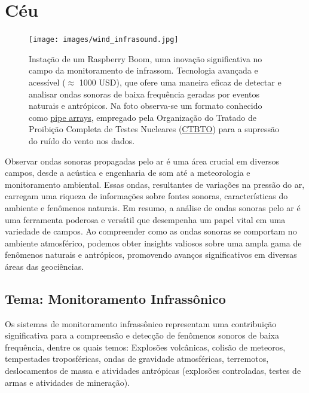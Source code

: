 \documentclass[10pt,a4paper,oneside]{book}
\newcommand{\HeroFigPad}{\vspace{-1cm}}
\begin{document}
\chapter{Céu}
\label{cap_ceu}

\begin{figure}[h]
	\HeroFigPad
	\begin{center}
		\texttt{[image: images/wind\_infrasound.jpg]}
	\end{center}
	\caption{
	Instação de um Raspberry Boom, uma inovação significativa no campo da monitoramento de infrassom. Tecnologia avançada e acessível ($\approx$ 1000 USD), que ofere uma maneira eficaz de detectar e analisar ondas sonoras de baixa frequência geradas por eventos naturais e antrópicos. Na foto observa-se um formato conhecido como \href{https://www.ctbto.org/our-work/monitoring-technologies/infrasound-monitoring}{pipe arrays}, empregado pela Organização do Tratado de Proibição Completa de Testes Nucleares (\href{https://www.ctbto.org/}{CTBTO}) para a supressão do ruído do vento nos dados.
    }
 \label{fig_wind}
\end{figure}

Observar ondas sonoras propagadas pelo ar é uma área crucial em diversos campos, desde a acústica e engenharia de som até a meteorologia e monitoramento ambiental. Essas ondas, resultantes de variações na pressão do ar, carregam uma riqueza de informações sobre fontes sonoras, características do ambiente e fenômenos naturais. Em resumo, a análise de ondas sonoras pelo ar é uma ferramenta poderosa e versátil que desempenha um papel vital em uma variedade de campos. Ao compreender como as ondas sonoras se comportam no ambiente atmosférico, podemos obter insights valiosos sobre uma ampla gama de fenômenos naturais e antrópicos, promovendo avanços significativos em diversas áreas das geociências.

\section{Tema: Monitoramento Infrassônico}

Os sistemas de monitoramento infrassônico representam uma contribuição significativa para a compreensão e detecção de fenômenos sonoros de baixa frequência, dentre os quais temos: Explosões volcânicas, colisão de meteoros, tempestades troposféricas, ondas de gravidade atmosféricas, terremotos, deslocamentos de massa e atividades antrópicas (explosões controladas, testes de armas e atividades de mineração).
\end{document}
